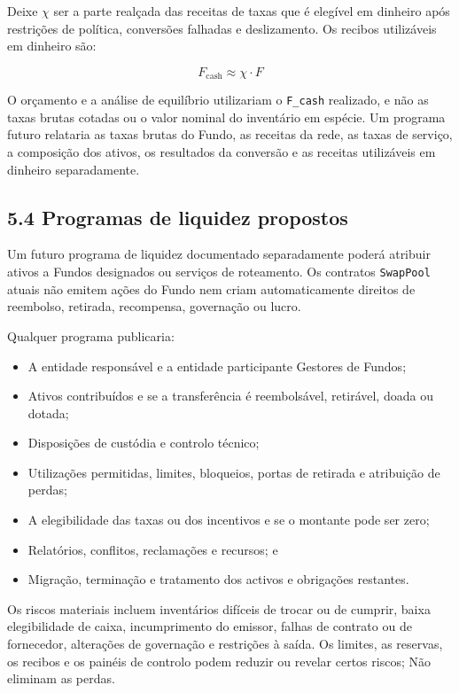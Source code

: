 \documentclass[11pt]{article}
\begin{document}
Deixe \texttt{$\chi$} ser a parte realçada das receitas de taxas que é elegível em dinheiro após restrições de política, conversões falhadas e deslizamento. Os recibos utilizáveis em dinheiro são:

\[
F_{\mathrm{cash}} \approx \chi \cdot F
\]

O orçamento e a análise de equilíbrio utilizariam o \texttt{F\_cash} realizado, e não as taxas brutas cotadas ou o valor nominal do inventário em espécie. Um programa futuro relataria as taxas brutas do Fundo, as receitas da rede, as taxas de serviço, a composição dos ativos, os resultados da conversão e as receitas utilizáveis em dinheiro separadamente.

\subsection*{5.4 Programas de liquidez propostos}

Um futuro programa de liquidez documentado separadamente poderá atribuir ativos a Fundos designados ou serviços de roteamento. Os contratos \texttt{SwapPool} atuais não emitem ações do Fundo nem criam automaticamente direitos de reembolso, retirada, recompensa, governação ou lucro.

Qualquer programa publicaria:

\begin{itemize}[leftmargin=*]
\item A entidade responsável e a entidade participante Gestores de Fundos;
\item Ativos contribuídos e se a transferência é reembolsável, retirável, doada ou dotada;
\item Disposições de custódia e controlo técnico;
\item Utilizações permitidas, limites, bloqueios, portas de retirada e atribuição de perdas;
\item A elegibilidade das taxas ou dos incentivos e se o montante pode ser zero;
\item Relatórios, conflitos, reclamações e recursos; e
\item Migração, terminação e tratamento dos activos e obrigações restantes.
\end{itemize}
Os riscos materiais incluem inventários difíceis de trocar ou de cumprir, baixa elegibilidade de caixa, incumprimento do emissor, falhas de contrato ou de fornecedor, alterações de governação e restrições à saída. Os limites, as reservas, os recibos e os painéis de controlo podem reduzir ou revelar certos riscos; Não eliminam as perdas.
\end{document}
